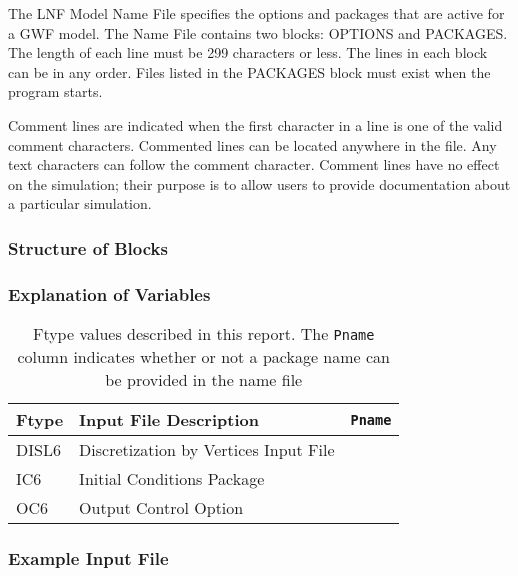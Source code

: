 The LNF Model Name File specifies the options and packages that are active for a GWF model.  The Name File contains two blocks: OPTIONS  and PACKAGES. The length of each line must be 299 characters or less. The lines in each block can be in any order.  Files listed in the PACKAGES block must exist when the program starts.

Comment lines are indicated when the first character in a line is one of the valid comment characters.  Commented lines can be located anywhere in the file. Any text characters can follow the comment character. Comment lines have no effect on the simulation; their purpose is to allow users to provide documentation about a particular simulation.

\vspace{5mm}
\subsubsection{Structure of Blocks}



\vspace{5mm}
\subsubsection{Explanation of Variables}
\begin{description}

\end{description}

\begin{table}[H]
\caption{Ftype values described in this report.  The \texttt{Pname} column indicates whether or not a package name can be provided in the name file}
\small
\begin{center}
\begin{tabular*}{\columnwidth}{l l l}
\hline
\hline
Ftype & Input File Description & \texttt{Pname}\\
\hline
DISL6 & Discretization by Vertices Input File \\
IC6 & Initial Conditions Package \\
OC6 & Output Control Option \\
\hline
\end{tabular*}
\label{table:ftype}
\end{center}
\normalsize
\end{table}

\vspace{5mm}
\subsubsection{Example Input File}


